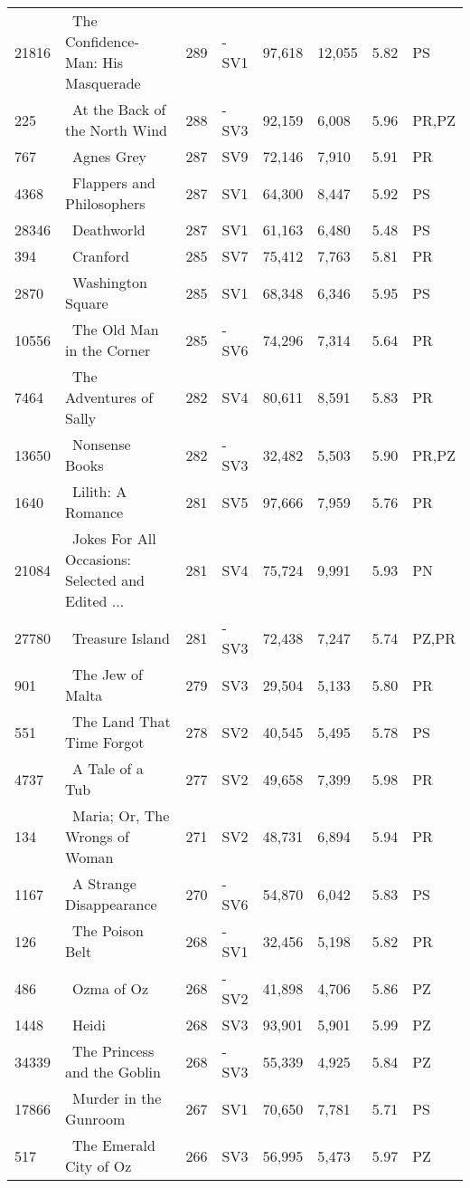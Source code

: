 \begin{longtable}{l | l | l | l | l | l | l | l}
21816 & ~The Confidence-Man: His Masquerade & 289 & -SV1 & 97,618 & 12,055 & 5.82 & PS\\
225 & ~At the Back of the North Wind & 288 & -SV3 & 92,159 & 6,008 & 5.96 & PR,PZ\\
767 & ~Agnes Grey & 287 & SV9 & 72,146 & 7,910 & 5.91 & PR\\
4368 & ~Flappers and Philosophers & 287 & SV1 & 64,300 & 8,447 & 5.92 & PS\\
28346 & ~Deathworld & 287 & SV1 & 61,163 & 6,480 & 5.48 & PS\\
394 & ~Cranford & 285 & SV7 & 75,412 & 7,763 & 5.81 & PR\\
2870 & ~Washington Square & 285 & SV1 & 68,348 & 6,346 & 5.95 & PS\\
10556 & ~The Old Man in the Corner & 285 & -SV6 & 74,296 & 7,314 & 5.64 & PR\\
7464 & ~The Adventures of Sally & 282 & SV4 & 80,611 & 8,591 & 5.83 & PR\\
13650 & ~Nonsense Books & 282 & -SV3 & 32,482 & 5,503 & 5.90 & PR,PZ\\
1640 & ~Lilith: A Romance & 281 & SV5 & 97,666 & 7,959 & 5.76 & PR\\
21084 & ~Jokes For All Occasions: Selected and Edited ... & 281 & SV4 & 75,724 & 9,991 & 5.93 & PN\\
27780 & ~Treasure Island & 281 & -SV3 & 72,438 & 7,247 & 5.74 & PZ,PR\\
901 & ~The Jew of Malta & 279 & SV3 & 29,504 & 5,133 & 5.80 & PR\\
551 & ~The Land That Time Forgot & 278 & SV2 & 40,545 & 5,495 & 5.78 & PS\\
4737 & ~A Tale of a Tub & 277 & SV2 & 49,658 & 7,399 & 5.98 & PR\\
134 & ~Maria; Or, The Wrongs of Woman & 271 & SV2 & 48,731 & 6,894 & 5.94 & PR\\
1167 & ~A Strange Disappearance & 270 & -SV6 & 54,870 & 6,042 & 5.83 & PS\\
126 & ~The Poison Belt & 268 & -SV1 & 32,456 & 5,198 & 5.82 & PR\\
486 & ~Ozma of Oz & 268 & -SV2 & 41,898 & 4,706 & 5.86 & PZ\\
1448 & ~Heidi & 268 & SV3 & 93,901 & 5,901 & 5.99 & PZ\\
34339 & ~The Princess and the Goblin & 268 & -SV3 & 55,339 & 4,925 & 5.84 & PZ\\
17866 & ~Murder in the Gunroom & 267 & SV1 & 70,650 & 7,781 & 5.71 & PS\\
517 & ~The Emerald City of Oz & 266 & SV3 & 56,995 & 5,473 & 5.97 & PZ\\

\end{longtable}
